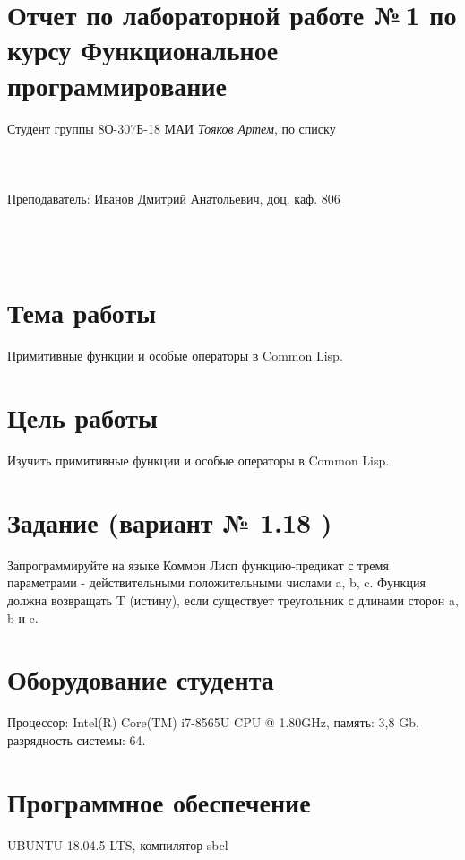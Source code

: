 \documentclass[12pt]{article}
\begin{document}
\section*{Отчет по лабораторной работе №\,1 
по курсу \guillemotleft  Функциональное программирование\guillemotright}
\begin{flushright}
Студент группы 8О-307Б-18 МАИ \textit{Тояков Артем},  по списку \\
 \\
 \\
\ \\
Преподаватель: Иванов Дмитрий Анатольевич, доц. каф. 806 \\
 \\
 \\
 \\

\end{flushright}

\section{Тема работы}
Примитивные функции и особые операторы в Common Lisp.

\section{Цель работы}
Изучить примитивные функции и особые операторы в Common Lisp.

\section{Задание (вариант № 1.18 )}
Запрограммируйте на языке Коммон Лисп функцию-предикат с тремя параметрами - действительными положительными числами a, b, c. Функция должна возвращать T (истину), если существует треугольник с длинами сторон a, b и c.

\section{Оборудование студента}
Процессор: Intel(R) Core(TM) i7-8565U CPU @ 1.80GHz, память: 3,8 Gb, разрядность системы: 64.

\section{Программное обеспечение}
UBUNTU 18.04.5 LTS, компилятор sbcl
\end{document}
